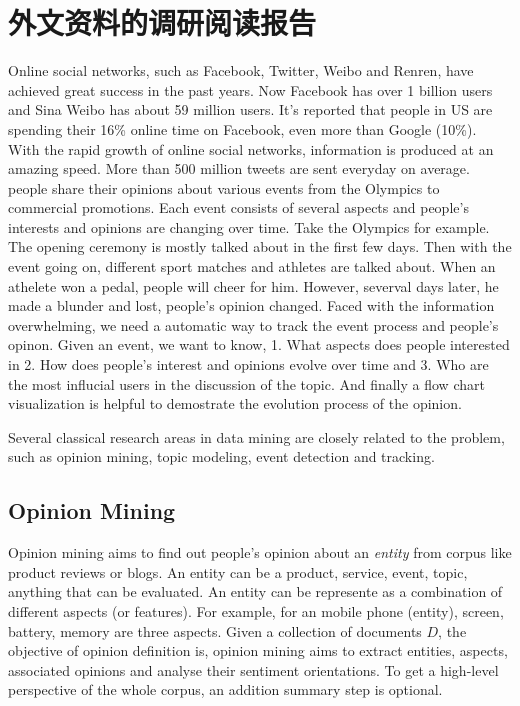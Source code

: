 
\chapter{外文资料的调研阅读报告}
\label{cha:engorg}


Online social networks, such as Facebook, Twitter, Weibo and Renren, have achieved great success in the past years. Now Facebook has over 1 billion users and Sina Weibo has about 59 million users. It's reported that people in US are spending their 16\% online time on Facebook, even more than Google (10\%). With the rapid growth of online social networks, information is produced at an amazing speed. More than 500 million tweets are sent everyday on average. people share their opinions about various events from the Olympics to commercial promotions. Each event consists of several aspects and people's interests and opinions are changing over time. Take the Olympics for example. The opening ceremony is mostly talked about in the first few days. Then with the event going on, different sport matches and athletes are talked about. When an athelete won a pedal, people will cheer for him. However, severval days later, he made a blunder and lost, people's opinion changed. Faced with the information overwhelming, we need a automatic way to track the event process and people's opinon. Given an event, we want to know, 1. What aspects does people interested in 2. How does people's interest and opinions evolve over time and 3. Who are the most influcial users in the discussion of the topic. And finally a flow chart visualization is helpful to demostrate the evolution process of the opinion.

Several classical research areas in data mining are closely related to the problem, such as opinion mining, topic modeling, event detection and tracking. 

\section {Opinion Mining}
Opinion mining aims to find out people's opinion about an {\em entity} from corpus like product reviews or blogs. An entity can be a product, service, event, topic, anything that can be evaluated. An entity can be represente as a combination of different aspects (or features). For example, for an mobile phone (entity), screen, battery, memory are three aspects. Given a collection of documents $D$, the objective of opinion definition is, opinion mining aims to extract entities, aspects, associated opinions and analyse their sentiment orientations. To get a high-level perspective of the whole corpus, an addition summary step is optional.

